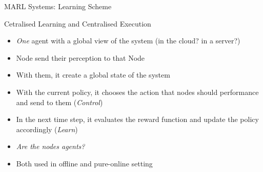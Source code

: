 \documentclass[presentation]{beamer}\mode<presentation>{\usetheme{AMSBolognaFC}}
\begin{document}
\begin{frame}{MARL Systems: Learning Scheme}
	\begin{exampleblock}{Cetralised Learning and Centralised Execution}
		\begin{itemize}
			\item \emph{One} agent with a global view of the system (in the cloud? in a server?)
			\item Node send their perception to that Node
			\item With them, it create a global state of the system
			\item With the current policy, it chooses the action that nodes should performance and send to them (\emph{Control})
			\item In the next time step, it evaluates the reward function and update the policy accordingly (\emph{Learn})
			\item \emph{Are the nodes agents?}
			\item Both used in offline and pure-online setting
		\end{itemize}
	\end{exampleblock}

\end{frame}
\end{document}
